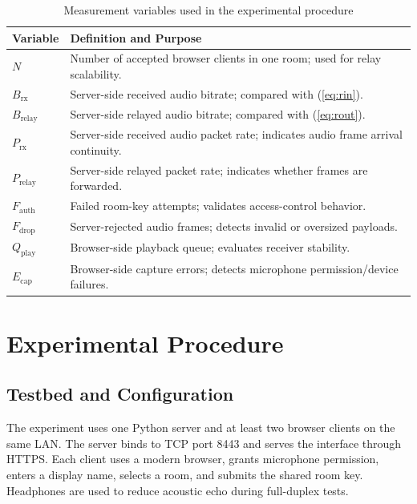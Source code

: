 \documentclass[conference]{IEEEtran}
\begin{document}
\begin{table}[t]
\centering
\caption{Measurement variables used in the experimental procedure}
\label{tab:variables}
\renewcommand{\arraystretch}{1.15}
\begin{tabularx}{\columnwidth}{lX}
\toprule
\textbf{Variable} & \textbf{Definition and Purpose} \\
\midrule
$N$ & Number of accepted browser clients in one room; used for relay scalability. \\
$B_{\mathrm{rx}}$ & Server-side received audio bitrate; compared with (\ref{eq:rin}). \\
$B_{\mathrm{relay}}$ & Server-side relayed audio bitrate; compared with (\ref{eq:rout}). \\
$P_{\mathrm{rx}}$ & Server-side received audio packet rate; indicates audio frame arrival continuity. \\
$P_{\mathrm{relay}}$ & Server-side relayed packet rate; indicates whether frames are forwarded. \\
$F_{\mathrm{auth}}$ & Failed room-key attempts; validates access-control behavior. \\
$F_{\mathrm{drop}}$ & Server-rejected audio frames; detects invalid or oversized payloads. \\
$Q_{\mathrm{play}}$ & Browser-side playback queue; evaluates receiver stability. \\
$E_{\mathrm{cap}}$ & Browser-side capture errors; detects microphone permission/device failures. \\
\bottomrule
\end{tabularx}
\end{table}

\section{Experimental Procedure}

\subsection{Testbed and Configuration}

The experiment uses one Python server and at least two browser clients on the same LAN. The server binds to TCP port 8443 and serves the interface through HTTPS. Each client uses a modern browser, grants microphone permission, enters a display name, selects a room, and submits the shared room key. Headphones are used to reduce acoustic echo during full-duplex tests.
\end{document}
